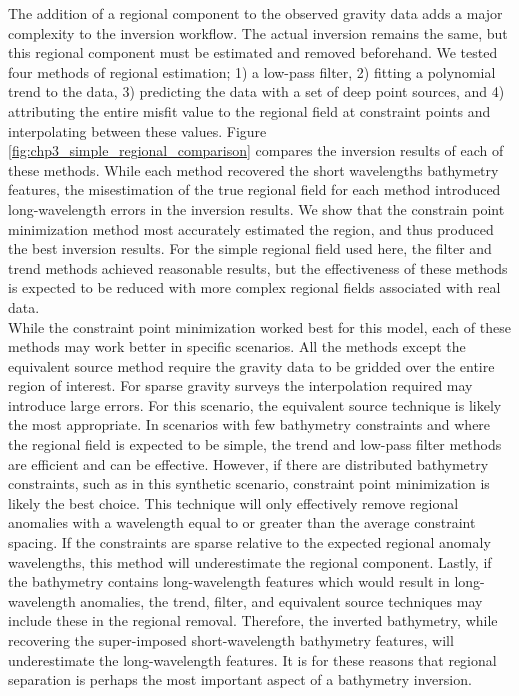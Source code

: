 The addition of a regional component to the observed gravity data adds a major complexity to the inversion workflow. The actual inversion remains the same, but this regional component must be estimated and removed beforehand. We tested four methods of regional estimation; 1) a low-pass filter, 2) fitting a polynomial trend to the data, 3) predicting the data with a set of deep point sources, and 4) attributing the entire misfit value to the regional field at constraint points and interpolating between these values. Figure \ref{fig:chp3_simple_regional_comparison} compares the inversion results of each of these methods. While each method recovered the short wavelengths bathymetry features, the misestimation of the true regional field for each method introduced long-wavelength errors in the inversion results. We show that the constrain point minimization method most accurately estimated the region, and thus produced the best inversion results. For the simple regional field used here, the filter and trend methods achieved reasonable results, but the effectiveness of these methods is expected to be reduced with more complex regional fields associated with real data. \\

While the constraint point minimization worked best for this model, each of these methods may work better in specific scenarios. All the methods except the equivalent source method require the gravity data to be gridded over the entire region of interest. For sparse gravity surveys the interpolation required may introduce large errors. For this scenario, the equivalent source technique is likely the most appropriate. In scenarios with few bathymetry constraints and where the regional field is expected to be simple, the trend and low-pass filter methods are efficient and can be effective. However, if there are distributed bathymetry constraints, such as in this synthetic scenario, constraint point minimization is likely the best choice. This technique will only effectively remove regional anomalies with a wavelength equal to or greater than the average constraint spacing. If the constraints are sparse relative to the expected regional anomaly wavelengths, this method will underestimate the regional component. Lastly, if the bathymetry contains long-wavelength features which would result in long-wavelength anomalies, the trend, filter, and equivalent source techniques may include these in the regional removal. Therefore, the inverted bathymetry, while recovering the super-imposed short-wavelength bathymetry features, will underestimate the long-wavelength features. It is for these reasons that regional separation is perhaps the most important aspect of a bathymetry inversion. 


